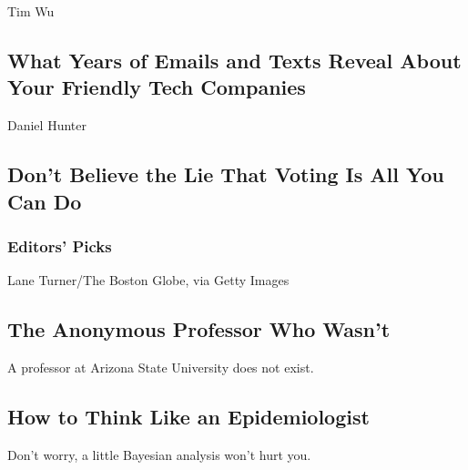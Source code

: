 Tim Wu

\hypertarget{what-years-of-emails-and-texts-reveal-about-your-friendly-tech-companies}{%
\subsection{What Years of Emails and Texts Reveal About Your Friendly
Tech
Companies}\label{what-years-of-emails-and-texts-reveal-about-your-friendly-tech-companies}}

\href{/2020/08/04/opinion/voting-2020-election-blm-movement.html}{}

Daniel Hunter

\hypertarget{dont-believe-the-lie-that-voting-is-all-you-can-do}{%
\subsection{Don't Believe the Lie That Voting Is All You Can
Do}\label{dont-believe-the-lie-that-voting-is-all-you-can-do}}

\hypertarget{editors-picks}{%
\subsubsection{Editors' Picks}\label{editors-picks}}

\href{/2020/08/04/style/college-coronavirus-hoax.html}{}

Lane Turner/The Boston Globe, via Getty Images

\href{/2020/08/04/style/college-coronavirus-hoax.html}{}

\hypertarget{the-anonymous-professor-who-wasnt}{%
\subsection{The Anonymous Professor Who
Wasn't}\label{the-anonymous-professor-who-wasnt}}

A professor at Arizona State University does not exist.

\href{/2020/08/04/science/coronavirus-bayes-statistics-math.html}{}

\hypertarget{how-to-think-like-an-epidemiologist}{%
\subsection{How to Think Like an
Epidemiologist}\label{how-to-think-like-an-epidemiologist}}

Don't worry, a little Bayesian analysis won't hurt you.

